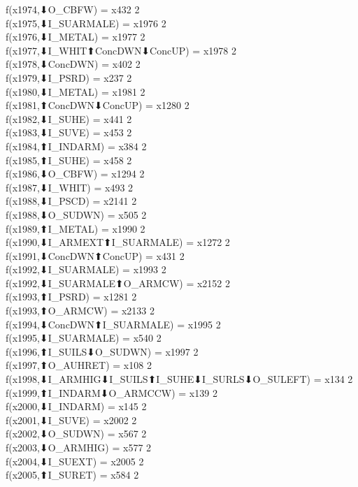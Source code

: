 f(x1974,⬇O_CBFW) = x432 {2} \\
f(x1975,⬇I_SUARMALE) = x1976 {2} \\
f(x1976,⬇I_METAL) = x1977 {2} \\
f(x1977,⬇I_WHIT⬆ConcDWN⬇ConcUP) = x1978 {2} \\
f(x1978,⬇ConcDWN) = x402 {2} \\
f(x1979,⬇I_PSRD) = x237 {2} \\
f(x1980,⬇I_METAL) = x1981 {2} \\
f(x1981,⬆ConcDWN⬇ConcUP) = x1280 {2} \\
f(x1982,⬇I_SUHE) = x441 {2} \\
f(x1983,⬇I_SUVE) = x453 {2} \\
f(x1984,⬆I_INDARM) = x384 {2} \\
f(x1985,⬆I_SUHE) = x458 {2} \\
f(x1986,⬇O_CBFW) = x1294 {2} \\
f(x1987,⬇I_WHIT) = x493 {2} \\
f(x1988,⬇I_PSCD) = x2141 {2} \\
f(x1988,⬇O_SUDWN) = x505 {2} \\
f(x1989,⬆I_METAL) = x1990 {2} \\
f(x1990,⬇I_ARMEXT⬆I_SUARMALE) = x1272 {2} \\
f(x1991,⬇ConcDWN⬆ConcUP) = x431 {2} \\
f(x1992,⬇I_SUARMALE) = x1993 {2} \\
f(x1992,⬇I_SUARMALE⬆O_ARMCW) = x2152 {2} \\
f(x1993,⬆I_PSRD) = x1281 {2} \\
f(x1993,⬆O_ARMCW) = x2133 {2} \\
f(x1994,⬇ConcDWN⬆I_SUARMALE) = x1995 {2} \\
f(x1995,⬇I_SUARMALE) = x540 {2} \\
f(x1996,⬆I_SUILS⬇O_SUDWN) = x1997 {2} \\
f(x1997,⬆O_AUHRET) = x108 {2} \\
f(x1998,⬇I_ARMHIG⬇I_SUILS⬆I_SUHE⬇I_SURLS⬇O_SULEFT) = x134 {2} \\
f(x1999,⬆I_INDARM⬇O_ARMCCW) = x139 {2} \\
f(x2000,⬇I_INDARM) = x145 {2} \\
f(x2001,⬇I_SUVE) = x2002 {2} \\
f(x2002,⬇O_SUDWN) = x567 {2} \\
f(x2003,⬇O_ARMHIG) = x577 {2} \\
f(x2004,⬇I_SUEXT) = x2005 {2} \\
f(x2005,⬆I_SURET) = x584 {2} \\
